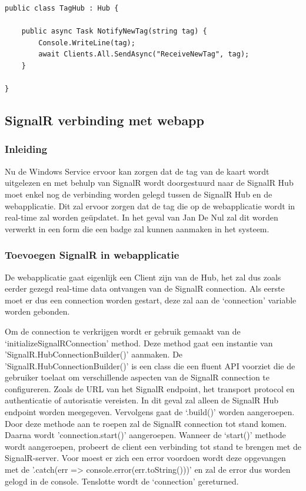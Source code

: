 \begin{verbatim} 
public class TagHub : Hub {
    
    public async Task NotifyNewTag(string tag) {
        Console.WriteLine(tag);
        await Clients.All.SendAsync("ReceiveNewTag", tag);
    }

}
\end{verbatim}

\subsection{SignalR verbinding met webapp}

\subsubsection{Inleiding}
Nu de Windows Service ervoor kan zorgen dat de tag van de kaart wordt uitgelezen en met behulp van SignalR wordt doorgestuurd naar de SignalR Hub moet enkel nog de verbinding worden gelegd tussen de SignalR Hub en de webapplicatie. Dit zal ervoor zorgen dat de tag die op de webapplicatie wordt in real-time zal worden geüpdatet. In het geval van Jan De Nul zal dit worden verwerkt in een form die een badge zal kunnen aanmaken in het systeem. 

\subsubsection{Toevoegen SignalR in webapplicatie}
De webapplicatie gaat eigenlijk een Client zijn van de Hub, het zal dus zoals eerder gezegd real-time data ontvangen van de SignalR connection. Als eerste moet er dus een connection worden gestart, deze zal aan de ‘connection’ variable worden gebonden.  

Om de connection te verkrijgen wordt er gebruik gemaakt van de ‘initializeSignalRConnection’ method. Deze method gaat een instantie van 'SignalR.HubConnectionBuilder()’ aanmaken. De 'SignalR.HubConnectionBuilder()’ is een class die een fluent API voorziet die de gebruiker toelaat om verschillende aspecten van de SignalR connection te configureren. Zoals de URL van het SignalR endpoint, het transport protocol en authenticatie of autorisatie vereisten. In dit geval zal alleen de SignalR Hub endpoint worden meegegeven. Vervolgens gaat de ‘.build()’ worden aangeroepen. Door deze methode aan te roepen zal de SignalR connection tot stand komen. Daarna wordt 'connection.start()’ aangeroepen. Wanneer de ‘start()’ methode wordt aangeroepen, probeert de client een verbinding tot stand te brengen met de SignalR-server. Voor moest er zich een error voordoen wordt deze opgevangen met de '.catch(err => console.error(err.toString()))' en zal de error dus worden gelogd in de console. Tenslotte wordt de ‘connection’ gereturned. 

